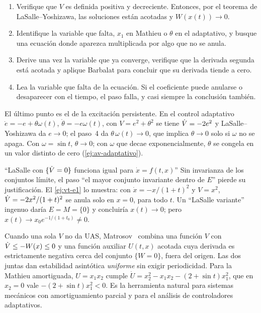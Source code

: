 \begin{receta}
\begin{enumerate}
  \item Verifique que $V$ es definida positiva y decreciente. Entonces, por el teorema de LaSalle--Yoshizawa, las soluciones están acotadas y $W(x(t))\to0$.
  \item Identifique la variable que falta, $x_1$ en Mathieu o $\theta$ en el adaptativo, y busque una ecuación donde aparezca multiplicada por algo que no se anula.
  \item Derive una vez la variable que ya converge, verifique que la derivada segunda está acotada y aplique Barbalat para concluir que su derivada tiende a cero.
  \item Lea la variable que falta de la ecuación. Si el coeficiente puede anularse o desaparecer con el tiempo, el paso falla, y casi siempre la conclusión también.
\end{enumerate}
\end{receta}

El último punto es el de la excitación persistente. En el control adaptativo $\dot e=-e+\theta\omega(t)$, $\dot\theta=-e\omega(t)$, con $V=e^2+\theta^2$ se tiene $\dot V=-2e^2$ y LaSalle--Yoshizawa da $e\to0$; el paso~4 da $\theta\,\omega(t)\to0$, que implica $\theta\to0$ solo si $\omega$ no se apaga. Con $\omega=\sin t$, $\theta\to0$; con $\omega$ que decae exponencialmente, $\theta$ se congela en un valor distinto de cero (\cref{ej:av-adaptativo}).

\begin{trampa}[label=tr:vt-lasalle]{``LaSalle con $\{\dot V=0\}$ funciona igual para $\dot x=f(t,x)$''}
Sin invarianza de los conjuntos límite, el paso ``el mayor conjunto invariante dentro de $E$'' pierde su justificación. El \cref{ej:vt-e1} lo muestra: con $\dot x=-x/(1+t)^2$ y $V=x^2$, $\dot V=-2x^2/(1+t)^2$ se anula solo en $x=0$, para todo $t$. Un ``LaSalle variante'' ingenuo daría $E=M=\{0\}$ y concluiría $x(t)\to0$; pero $x(t)\to x_0e^{-1/(1+t_0)}\neq0$.
\end{trampa}

\begin{profundiza}
Cuando una sola $V$ no da UAS, Matrosov~\citep{Mat62} combina una función $V$ con $\dot V\le-W(x)\le0$ y una función auxiliar $U(t,x)$ acotada cuya derivada es estrictamente negativa cerca del conjunto $\{W=0\}$, fuera del origen. Las dos juntas dan estabilidad asintótica \emph{uniforme} sin exigir periodicidad. Para la Mathieu amortiguada, $U=x_1x_2$ cumple $\dot U=x_2^2-x_1x_2-(2+\sin t)x_1^2$, que en $x_2=0$ vale $-(2+\sin t)x_1^2<0$. Es la herramienta natural para sistemas mecánicos con amortiguamiento parcial y para el análisis de controladores adaptativos.
\end{profundiza}
